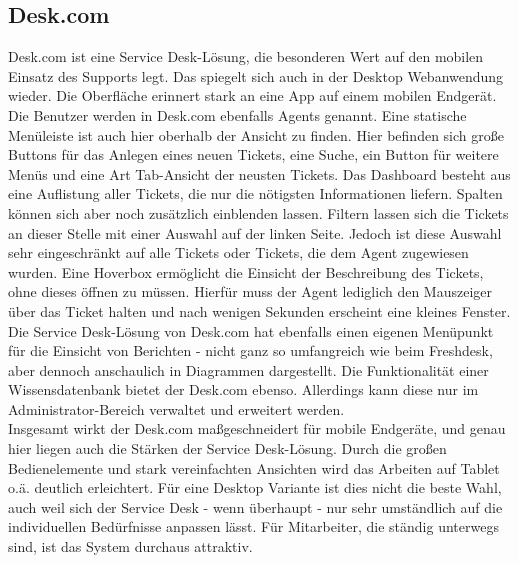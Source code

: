 \subsection{Desk.com}
\noindent
Desk.com ist eine Service Desk-Lösung, die besonderen Wert auf den mobilen Einsatz des Supports legt. Das spiegelt sich auch in der Desktop Webanwendung wieder. Die Oberfläche erinnert stark an eine App auf einem mobilen Endgerät. Die Benutzer werden in Desk.com ebenfalls Agents genannt. 
Eine statische Menüleiste ist auch hier oberhalb der Ansicht zu finden. Hier befinden sich große Buttons für das Anlegen eines neuen Tickets, eine Suche, ein Button für weitere Menüs und eine Art Tab-Ansicht der neusten Tickets. Das Dashboard besteht aus eine Auflistung aller Tickets, die nur die nötigsten Informationen liefern. Spalten können sich aber noch zusätzlich einblenden lassen. Filtern lassen sich die Tickets an dieser Stelle mit einer Auswahl auf der linken Seite. Jedoch ist diese Auswahl sehr eingeschränkt auf alle Tickets oder Tickets, die dem Agent zugewiesen wurden. Eine Hoverbox ermöglicht die Einsicht der Beschreibung des Tickets, ohne dieses öffnen zu müssen. Hierfür muss der Agent lediglich den Mauszeiger über das Ticket halten und nach wenigen Sekunden erscheint eine kleines Fenster. Die Service Desk-Lösung von Desk.com hat ebenfalls einen eigenen Menüpunkt für die Einsicht von Berichten - nicht ganz so umfangreich wie beim Freshdesk, aber dennoch anschaulich in Diagrammen dargestellt. Die Funktionalität einer Wissensdatenbank bietet der Desk.com ebenso. Allerdings kann diese nur im Administrator-Bereich verwaltet und erweitert werden.\\
Insgesamt wirkt der Desk.com maßgeschneidert für mobile Endgeräte, und genau hier liegen auch die Stärken der Service Desk-Lösung. Durch die großen Bedienelemente und stark vereinfachten Ansichten wird das Arbeiten auf Tablet o.ä. deutlich erleichtert. Für eine Desktop Variante ist dies nicht die beste Wahl, auch weil sich der Service Desk - wenn überhaupt - nur sehr umständlich auf die individuellen Bedürfnisse anpassen  lässt. Für Mitarbeiter, die ständig unterwegs sind, ist das System durchaus attraktiv.\\

